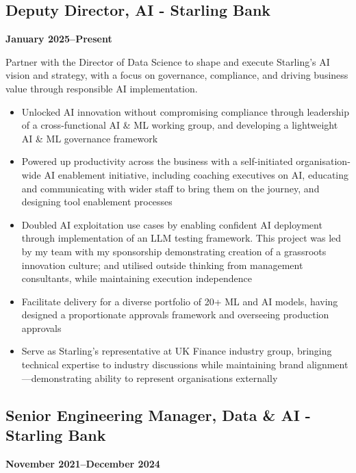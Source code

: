 \documentclass[a4paper]{scrartcl}
\begin{document}
\subsection*{Deputy Director, AI - Starling Bank}
\textbf{January 2025--Present}

Partner with the Director of Data Science to shape and execute Starling's AI vision and strategy, with a focus on governance, compliance, and driving business value through responsible AI implementation.
\begin{itemize}
	\item Unlocked AI innovation without compromising compliance through leadership of a cross-functional AI \& ML working group, and developing a lightweight AI \& ML governance framework
	\item Powered up productivity across the business with a self-initiated organisation-wide AI enablement initiative, including coaching executives on AI, educating and communicating with wider staff to bring them on the journey, and designing tool enablement processes
	\item Doubled AI exploitation use cases by enabling confident AI deployment through implementation of an LLM testing framework. This project was led by my team with my sponsorship demonstrating creation of a grassroots innovation culture; and utilised outside thinking from management consultants, while maintaining execution independence
	\item Facilitate delivery for a diverse portfolio of 20+ ML and AI models, having designed a proportionate approvals framework and overseeing production approvals
	\item Serve as Starling's representative at UK Finance industry group, bringing technical expertise to industry discussions while maintaining brand alignment—demonstrating ability to represent organisations externally
\end{itemize}

\subsection*{Senior Engineering Manager, Data \& AI - Starling Bank}
\textbf{November 2021--December 2024}
\end{document}

